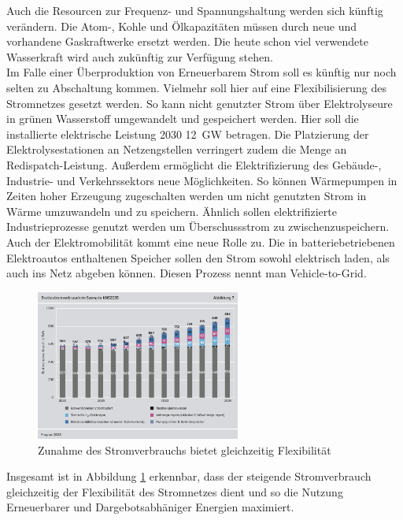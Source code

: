 		Auch die Resourcen zur Frequenz- und Spannungshaltung werden sich künftig verändern. Die Atom-, Kohle und Ölkapazitäten müssen durch neue und vorhandene Gaskraftwerke ersetzt werden. Die heute schon viel verwendete Wasserkraft wird auch zukünftig zur Verfügung stehen.\\
		Im Falle einer Überproduktion von Erneuerbarem Strom soll es künftig nur noch selten zu Abschaltung kommen. Vielmehr soll hier auf eine Flexibilisierung des Stromnetzes gesetzt werden. So kann nicht genutzter Strom über Elektrolyseure in grünen Wasserstoff umgewandelt und gespeichert werden. Hier soll die installierte elektrische Leistung 2030 \SI{12}{\giga \watt } betragen. Die Platzierung der Elektrolysestationen an Netzengstellen verringert zudem die Menge an Redispatch-Leistung. Außerdem ermöglicht die Elektrifizierung des Gebäude-, Industrie- und Verkehrssektors neue Möglichkeiten. So können Wärmepumpen in Zeiten hoher Erzeugung zugeschalten werden um nicht genutzten Strom in Wärme umzuwandeln und zu speichern. Ähnlich sollen elektrifizierte Industrieprozesse genutzt werden um Überschussstrom zu zwischenzuspeichern.\\
		Auch der Elektromobilität kommt eine neue Rolle zu. Die in batteriebetriebenen Elektroautos enthaltenen Speicher sollen den Strom sowohl elektrisch laden, als auch ins Netz abgeben können. Diesen Prozess nennt man Vehicle-to-Grid.\\
			
			\begin{figure}[H]
				\centering
				\includegraphics[page=1, clip, width=0.6\textwidth]{./anhang/Zunahme Stromverbrauch Agora2035.png}
				\caption{Zunahme des Stromverbrauchs bietet gleichzeitig Flexibilität}
				\label{Abb. Zunahme Flexibilität}
			\end{figure}
		
		Insgesamt ist in Abbildung \ref{Abb. Zunahme Flexibilität} erkennbar, dass der steigende Stromverbrauch gleichzeitig der Flexibilität des Stromnetzes dient und so die Nutzung Erneuerbarer und Dargebotsabhäniger Energien maximiert.\\
		
